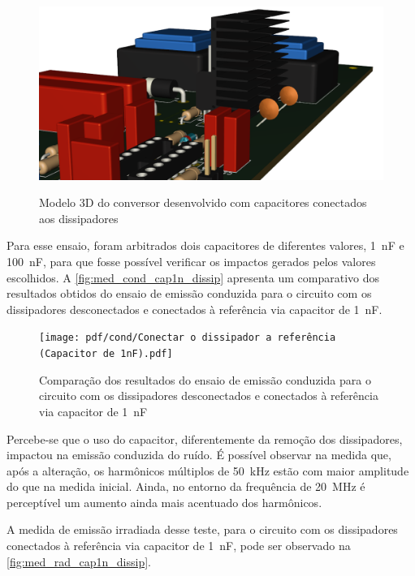     \begin{figure}[H]
    	\centering
    	\caption{Modelo 3D do conversor desenvolvido com capacitores conectados aos dissipadores}
    	\includegraphics[scale=.35]{pdf/fotos/tecnica_capacitor.png}
        \label{fig:3d_tecnica_capacitor}
    \end{figure}
    
    Para esse ensaio, foram arbitrados dois capacitores de diferentes valores, \SI{1}{\nano\farad} e \SI{100}{\nano\farad}, para que fosse possível verificar os impactos gerados pelos valores escolhidos. A \autoref{fig:med_cond_cap1n_dissip} apresenta um comparativo dos resultados obtidos do ensaio de emissão conduzida para o circuito com os dissipadores desconectados e conectados à referência via capacitor de \SI{1}{\nano\farad}.
    
    \begin{figure}[H]
    	\centering
    	\caption{Comparação dos resultados do ensaio de emissão conduzida para o circuito com os dissipadores desconectados e conectados à referência via capacitor de \SI{1}{\nano\farad}}
    	\texttt{[image: pdf/cond/Conectar o dissipador a referência (Capacitor de 1nF).pdf]}
    	\label{fig:med_cond_cap1n_dissip}
    \end{figure}
    
    Percebe-se que o uso do capacitor, diferentemente da remoção dos dissipadores, impactou na emissão conduzida do ruído. É possível observar na medida que, após a alteração, os harmônicos múltiplos de \SI{50}{\kilo\hertz} estão com maior amplitude do que na medida inicial. Ainda, no entorno da frequência de \SI{20}{\mega\hertz} é perceptível um aumento ainda mais acentuado dos harmônicos. 
    
    A medida de emissão irradiada desse teste, para o circuito com os dissipadores conectados à referência via capacitor de \SI{1}{\nano\farad}, pode ser observado na \autoref{fig:med_rad_cap1n_dissip}. 
    
